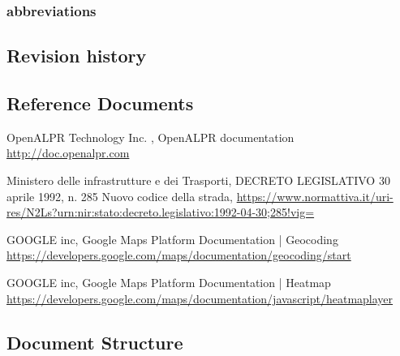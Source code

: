 \subsubsection{abbreviations}


\subsection{Revision history}


\subsection{Reference Documents}
\begin{thebibliography}{00}
OpenALPR Technology Inc. ,
OpenALPR documentation \url{http://doc.openalpr.com}

 Ministero delle infrastrutture e dei Trasporti,
DECRETO LEGISLATIVO 30 aprile 1992, n. 285 Nuovo codice della strada,
 \url{https://www.normattiva.it/uri-res/N2Ls?urn:nir:stato:decreto.legislativo:1992-04-30;285!vig=}

 GOOGLE inc,
 Google Maps Platform Documentation | Geocoding
 \url{https://developers.google.com/maps/documentation/geocoding/start}

 GOOGLE inc,
 Google Maps Platform Documentation | Heatmap
 \url{https://developers.google.com/maps/documentation/javascript/heatmaplayer}

\end{thebibliography}


\subsection{Document Structure}
